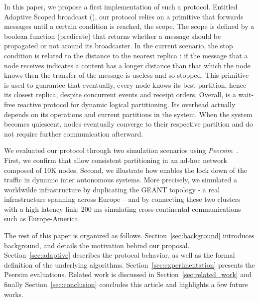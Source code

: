 In this paper, we propose a first implementation of such a protocol.
Entitled Adaptive Scoped broadcast (\NAME), 
our protocol relies on a primitive that forwards
messages until a certain condition is reached, \ie the scope. The
scope is defined by a boolean function (predicate) that returns
whether a message should be propagated or not around its
broadcaster. In the current scenario, the stop condition is related to
the distance to the nearest replica : if the message that a node receives
indicates a content has a longer distance than that which the node
knows then the transfer of the message is useless and so stopped.
%
This primitive is used to guarantee that eventually, every node knows
its best partition, hence its closest replica, despite concurrent
events and receipt orders. Overall, \NAME is a wait-free reactive protocol for
dynamic logical partitioning.  Its overhead actually depends on
its operations and current partitions in the system. When the system
becomes quiescent, nodes eventually converge to their respective
partition and do not require further communication afterward.


We evaluated our protocol through two simulation scenarios using
\textit{Peersim}~\cite{montresor2009peersim}. First, we confirm that
\NAME allow consistent partitioning in an ad-hoc network composed of
10K nodes.  Second, we illustrate how \NAME enables the lock down of
the traffic in dynamic inter autonomous systems.  More precisely, we
simulated a worldwilde infrastructure by duplicating the GEANT
topology - a real infrastructure spanning across Europe – and by
connecting these two clusters with a high latency link: 200 ms
simulating cross-continental communications such as Europe-America.


The rest of this paper is organized as
follows. Section~\ref{sec:background} introduces background, and
details the motivation behind our proposal.
Section~\ref{sec:adaptive} describes the protocol behavior, as well
as the formal definition of the underlying
algorithms. Section~\ref{sec:experimentation} presents the Peersim
evaluations.  Related work is discussed in
Section~\ref{sec:related_work} and finally
Section~\ref{sec:conclusion} concludes this article and highlights a
few future works.
  

